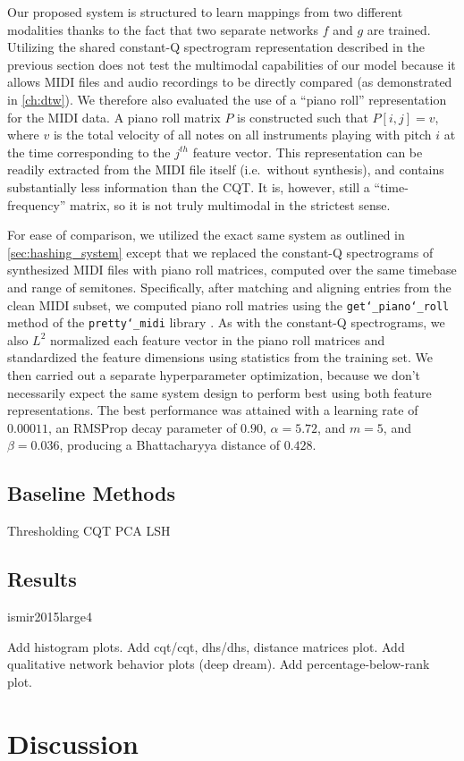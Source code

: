 Our proposed system is structured to learn mappings from two different modalities thanks to the fact that two separate networks $f$ and $g$ are trained.
Utilizing the shared constant-Q spectrogram representation described in the previous section does not test the multimodal capabilities of our model because it allows MIDI files and audio recordings to be directly compared (as demonstrated in \cref{ch:dtw}).
We therefore also evaluated the use of a ``piano roll'' representation for the MIDI data.
A piano roll matrix $P$ is constructed such that $P[i, j] = v$, where $v$ is the total velocity of all notes on all instruments playing with pitch $i$ at the time corresponding to the $j^{th}$ feature vector.
This representation can be readily extracted from the MIDI file itself (i.e.\ without synthesis), and contains substantially less information than the CQT.
It is, however, still a ``time-frequency'' matrix, so it is not truly multimodal in the strictest sense.

For ease of comparison, we utilized the exact same system as outlined in \cref{sec:hashing_system} except that we replaced the constant-Q spectrograms of synthesized MIDI files with piano roll matrices, computed over the same timebase and range of semitones.
Specifically, after matching and aligning entries from the clean MIDI subset, we computed piano roll matries using the \texttt{get\char`_piano\char`_roll} method of the \texttt{pretty\char`_midi} library \cite{raffel2014pretty_midi}.
As with the constant-Q spectrograms, we also $L^2$ normalized each feature vector in the piano roll matrices and standardized the feature dimensions using statistics from the training set.
We then carried out a separate hyperparameter optimization, because we don't necessarily expect the same system design to perform best using both feature representations.
The best performance was attained with a learning rate of $0.00011$, an RMSProp decay parameter of $0.90$, $\alpha = 5.72$, and $m = 5$, and $\beta = 0.036$, producing a Bhattacharyya distance of $0.428$.

\subsection{Baseline Methods}

Thresholding CQT PCA
LSH


\subsection{Results}



ismir2015large4

Add histogram plots.
Add cqt/cqt, dhs/dhs, distance matrices plot.
Add qualitative network behavior plots (deep dream).
Add percentage-below-rank plot.

\section{Discussion}
\label{sec:dhs_discussion}
